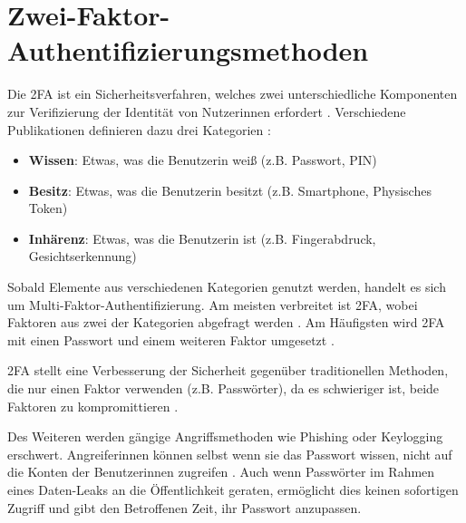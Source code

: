 \chapter{Zwei-Faktor-Authentifizierungsmethoden}

Die \ac{2FA} ist ein Sicherheitsverfahren, welches zwei unterschiedliche Komponenten zur Verifizierung der Identität von Nutzerinnen erfordert \parencite{decristofaroComparativeUsability2014}. Verschiedene Publikationen definieren dazu drei Kategorien \parencite{decristofaroComparativeUsability2014, yuEfficientGeneric2014, singhMultifactorAuthentication2017}:
\begin{itemize}
  \item \textbf{Wissen}: Etwas, was die Benutzerin weiß (z.B. Passwort, PIN)
  \item \textbf{Besitz}: Etwas, was die Benutzerin besitzt (z.B. Smartphone, Physisches Token)
  \item \textbf{Inhärenz}: Etwas, was die Benutzerin ist (z.B. Fingerabdruck, Gesichtserkennung)
\end{itemize}
Sobald Elemente aus verschiedenen Kategorien genutzt werden, handelt es sich um Multi-Faktor-Authentifizierung. Am meisten verbreitet ist \ac{2FA}, wobei Faktoren aus zwei der Kategorien abgefragt werden \parencite{decristofaroComparativeUsability2014}. Am Häufigsten wird \ac{2FA} mit einen Passwort und einem weiteren Faktor umgesetzt \parencite{decristofaroComparativeUsability2014}.

\pskip
\ac{2FA} stellt eine Verbesserung der Sicherheit gegenüber traditionellen Methoden, die nur einen Faktor verwenden (z.B. Passwörter), da es schwieriger ist, beide Faktoren zu kompromittieren \parencite{dasguptaMultiFactorAuthentication2017}.

Des Weiteren werden gängige Angriffsmethoden wie Phishing oder Keylogging erschwert. Angreiferinnen können selbst wenn sie das Passwort wissen, nicht auf die Konten der Benutzerinnen zugreifen \parencite{dasguptaMultiFactorAuthentication2017}. Auch wenn Passwörter im Rahmen eines Daten-Leaks an die Öffentlichkeit geraten, ermöglicht dies keinen sofortigen Zugriff und gibt den Betroffenen Zeit, ihr Passwort anzupassen.

